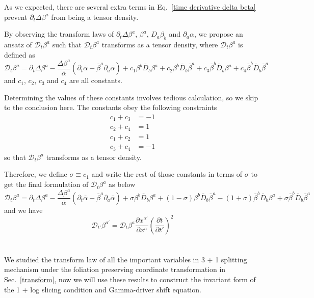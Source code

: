 \documentclass[letterpaper,nofootinbib,prd,amsmath,onecolumn]{revtex4-1}
\begin{document}
As we expected, there are several extra terms in Eq.~\ref{time derivative delta beta} prevent $\partial_{t}\Delta\beta^{a}$ from being a tensor density. 

By observing the transform laws of $\partial_{t}\Delta\beta^{a}$, $\beta^{a}$, $D_{a}\beta_{b}$ and $\partial_{a}\alpha$, we propose an ansatz of $\mathscr{D}_{t}\beta^{a}$ such that $\mathscr{D}_{t}\beta^{a}$ transforms as a tensor density, where $\mathscr{D}_{t}\beta^{a}$ is defined as
\begin{equation}
\mathscr{D}_{t}\beta^{a} = \partial_{t}\Delta \beta^{a} - \frac{\Delta \beta^{a}}{{\bar \alpha}}(\partial_{t}{\bar \alpha} - {\bar \beta}^{a}\partial_{a}{\bar \alpha}) + c_{1}\beta^{b}{\bar D}_{b}\beta^{a} + c_{2}\beta^{b}{\bar D}_{b}{\bar \beta}^{a} + c_{3}{\bar \beta}^{b}{\bar D}_{b}\beta^{a} + c_{4}{\bar \beta}^{b}{\bar D}_{b}{\bar \beta}^{a}
\end{equation}
and $c_{1}$, $c_{2}$, $c_{3}$ and $c_{4}$ are all constants. 

Determining the values of these constants involves tedious calculation, so we skip to the conclusion here. The constants obey the following constraints
\begin{align*}
c_{1} + c_{3} & = -1\\
c_{2} + c_{4} & = 1\\
c_{1} + c_{2} & = 1\\
c_{3} + c_{4} & = -1 
\end{align*}
so that $\mathscr{D}_{t} \beta^{a}$ transforms as a tensor density. 

Therefore, we define $\sigma \equiv c_{1}$ and write the rest of those constants in terms of $\sigma$ to get the final formulation of $\mathscr{D}_{t}\beta^{a}$ as below
\begin{equation}
\mathscr{D}_{t}\beta^{a} = \partial_{t}\Delta \beta^{a} - \frac{\Delta \beta^{a}}{{\bar \alpha}}(\partial_{t}{\bar \alpha} - {\bar \beta}^{a}\partial_{a}{\bar \alpha}) + \sigma\beta^{b}{\bar D}_{b}\beta^{a} + (1-\sigma)\beta^{b}{\bar D}_{b}{\bar \beta}^{a} - (1 + \sigma){\bar \beta}^{b}{\bar D}_{b}\beta^{a} + \sigma{\bar \beta}^{b}{\bar D}_{b}{\bar \beta}^{a}
\end{equation}
and we have
\begin{equation}
\mathscr{D}_{t'}\beta^{a'} = \mathscr{D}_{t}\beta^{a}\frac{\partial x^{a'}}{\partial x^{a}}\left(\frac{\partial t}{\partial t'}\right)^{2}
\end{equation}
\section{}\label{gauge}
We studied the transform law of all the important variables in 3 + 1 splitting mechanism under the foliation preserving coordinate transformation in Sec.~\ref{transform}, now we will use these results to construct the invariant form of the 1 + log slicing condition and Gamma-driver shift equation. 
\end{document}
